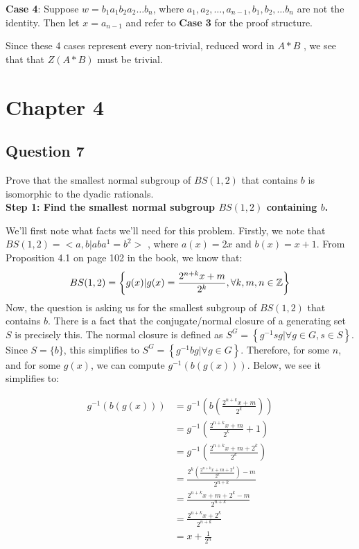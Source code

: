 \textbf{Case 4}: Suppose $w=b_{1}a_{1}b_{2}a_{2}\ldots b_{n}$, where $a_1,a_2,\ldots ,a_{n-1}, b_1,b_2,\ldots b_n$ are not the identity. Then let $x=a_{n-1}$ and refer to \textbf{Case 3} for the proof structure. 

Since these 4 cases represent every non-trivial, reduced word in $A*B$ , we see that that $Z(A*B)$ must be trivial.

\section*{Chapter 4}

\subsection*{Question 7}

Prove that the smallest normal subgroup of $BS(1, 2)$ that contains $b$ is isomorphic to the dyadic rationals.\\

\textbf{Step 1: Find the smallest normal subgroup $BS(1,2)$ containing $b$.}

We'll first note what facts we'll need for this problem. Firstly, we note that $BS(1,2)=<a,b|aba^1=b^2>$ , where  $a(x)=2x$ and $b(x)=x+1$.  From Proposition 4.1 on page 102 in the book, we know that: 
\begin{equation}
BS(1,2)=\left\{g(x) | g(x)=\frac{2^{n+k}x+m}{2^k}, \forall k, m, n \in \mathbb{Z} \right\}
\end{equation}
Now, the question is asking us for the smallest subgroup of $BS(1,2)$ that contains $b$. There is a fact that the conjugate/normal closure of a generating set $S$ is precisely this. The normal closure is defined as $S^G=\left\{g^{-1}sg|\forall g\in G, s\in S\right\}$. Since $S=\{b\}$, this simplifies to $S^G=\left\{g^{-1}bg|\forall g\in G\right\}$. Therefore, for some $n$, and for some $g(x)$, we can compute $g^{-1}(b(g(x)))$. Below, we see it simplifies to:

\begin{align*}
g^{-1}(b(g(x)))
&= g^{-1}\left(b\left(\frac{2^{n+k}x+m}{2^k}\right)\right) \\
&= g^{-1}\left(\frac{2^{n+k}x+m}{2^k}+1\right) \\
&= g^{-1}\left(\frac{2^{n+k}x+m+2^k}{2^k}\right) \\
&= \frac{2^k\left(\frac{2^{n+k}x+m+2^k}{2^k}\right)-m}{2^{n+k}} \\
&= \frac{2^{n+k}x+m+2^k-m}{2^{n+k}} \\
&= \frac{2^{n+k}x+2^k}{2^{n+k}} \\
&= x+\frac{1}{2^{n}}
\end{align*}

